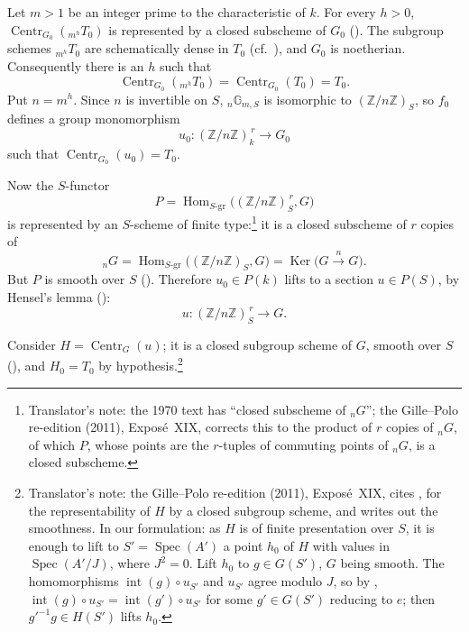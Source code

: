 Let \(m>1\) be an integer prime to the characteristic of \(k\).
For every \(h>0\),
\(\operatorname{Centr}_{G_0}({}_{m^h}T_0)\) is represented by a
closed subscheme of \(G_0\) \textup{()}.  The subgroup schemes
\({}_{m^h}T_0\) are schematically dense in \(T_0\)
\textup{(cf.\ )}, and \(G_0\) is noetherian.
Consequently there is an \(h\) such that
\[
  \operatorname{Centr}_{G_0}({}_{m^h}T_0)
  =
  \operatorname{Centr}_{G_0}(T_0)
  =
  T_0.
\]
Put \(n=m^h\).  Since \(n\) is invertible on \(S\),
\({}_n\mathbb G_{m,S}\) is isomorphic to
\((\mathbb Z/n\mathbb Z)_S\), so \(f_0\) defines a group
monomorphism
\[
  u_0\colon(\mathbb Z/n\mathbb Z)_k^{\,r}\longrightarrow G_0
\]
such that \(\operatorname{Centr}_{G_0}(u_0)=T_0\).

Now the \(S\)-functor
\[
  P=
  \operatorname{Hom}_{S\text{-}\mathrm{gr}}
  \bigl((\mathbb Z/n\mathbb Z)_S^{\,r},G\bigr)
\]
is represented by an \(S\)-scheme of finite type:\footnote{Translator's note: the 1970 text has ``closed subscheme of
\({}_nG\)''; the Gille--Polo re-edition (2011), Exposé~XIX, corrects this to
the product of \(r\) copies of \({}_nG\), of which \(P\), whose points are the
\(r\)-tuples of commuting points of \({}_nG\), is a closed subscheme.} it is a closed
subscheme of \(r\) copies of
\[
  {}_nG
  =
  \operatorname{Hom}_{S\text{-}\mathrm{gr}}
  \bigl((\mathbb Z/n\mathbb Z)_S,G\bigr)
  =
  \operatorname{Ker}\bigl(G\xrightarrow{\,n\,}G\bigr).
\]
But \(P\) is smooth over \(S\) \textup{()}.
Therefore \(u_0\in P(k)\) lifts to a section \(u\in P(S)\), by
Hensel's lemma \textup{()}:
\[
  u\colon(\mathbb Z/n\mathbb Z)_S^{\,r}\longrightarrow G.
\]

Consider \(H=\operatorname{Centr}_G(u)\); it is a closed subgroup
scheme of \(G\), smooth over \(S\) \textup{()}, and
\(H_0=T_0\) by hypothesis.\footnote{Translator's note: the Gille--Polo re-edition (2011), Exposé~XIX, cites
, for the representability of \(H\) by a closed subgroup scheme,
and writes out the smoothness. In our formulation: as \(H\) is of finite
presentation over \(S\), it is enough to lift to \(S'=\operatorname{Spec}(A')\)
a point \(h_0\) of \(H\) with values in \(\operatorname{Spec}(A'/J)\), where
\(J^2=0\). Lift \(h_0\) to \(g\in G(S')\), \(G\) being smooth. The homomorphisms
\(\operatorname{int}(g)\circ u_{S'}\) and \(u_{S'}\) agree modulo \(J\), so by
, \(\operatorname{int}(g)\circ u_{S'}=\operatorname{int}(g')\circ
u_{S'}\) for some \(g'\in G(S')\) reducing to \(e\); then \(g'^{-1}g\in H(S')\)
lifts \(h_0\).}

